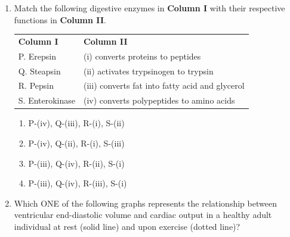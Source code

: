 \documentclass[journal,12pt,onecolumn]{IEEEtran}
\begin{document}
\begin{enumerate}[label=\arabic*.,resume]
\item Match the following digestive enzymes in \textbf{Column I} with their respective functions in \textbf{Column II}.

\begin{table}[H]
\centering
\begin{tabular}{ll}
\textbf{Column I} & \textbf{Column II} \\
P. Erepsin & (i) converts proteins to peptides \\
Q. Steapsin & (ii) activates trypsinogen to trypsin \\
R. Pepsin & (iii) converts fat into fatty acid and glycerol \\
S. Enterokinase & (iv) converts polypeptides to amino acids \\
\end{tabular}
\end{table}

\begin{multicols}{2}
\begin{enumerate}[label=(\Alph*)]
\item P-(iv), Q-(iii), R-(i), S-(ii)
\item P-(iv), Q-(ii), R-(i), S-(iii)
\item P-(iii), Q-(iv), R-(ii), S-(i)
\item P-(iii), Q-(iv), R-(iii), S-(i)
\end{enumerate}
\end{multicols}

\item Which ONE of the following graphs represents the relationship between ventricular end-diastolic volume and cardiac output in a healthy adult individual at rest (solid line) and upon exercise (dotted line)?


\end{enumerate}
\end{document}
